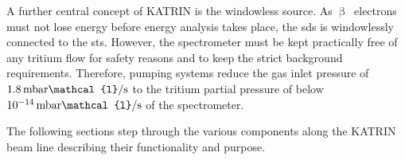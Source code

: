 A further central concept of KATRIN is the windowless source. As $\upbeta$~electrons must not lose energy before energy analysis takes place, the \gls{sds} is windowlessly connected to the \gls{sts}. However, the spectrometer must be kept practically free of any tritium flow for safety reasons and to keep the strict background requirements. Therefore, pumping systems reduce the gas inlet pressure of $1.8\text{\,mbar}\mathcal{l}/\text{s}$ to the tritium partial pressure of below $10^{-14}\text{\,mbar}\mathcal{l}/\text{s}$ of the spectrometer.

The following sections step through the various components along the KATRIN beam line describing their functionality and purpose.
